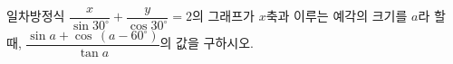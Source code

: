 일차방정식 $\dfrac{x}{\sin 30^\circ}+\dfrac{y}{\cos 30^\circ}=2$의 그래프가 $x$축과 이루는 예각의 크기를 $a$라 할 때, $\dfrac{\sin a+\cos\,(a-60^\circ)}{\tan a}$의 값을 구하시오.
